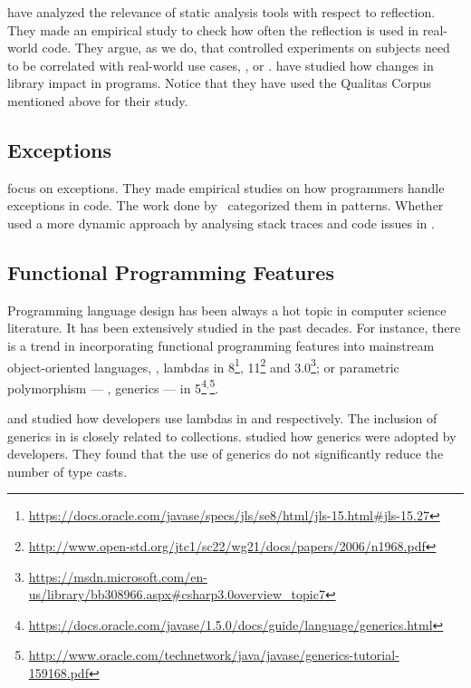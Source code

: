 \cite{landmanChallengesStaticAnalysis2017} have analyzed the relevance of static analysis tools with respect to reflection.
They made an empirical study to check how often the reflection \api{} is used in real-world code.
They argue, as we do, that controlled experiments on subjects need to be correlated with real-world use cases, \eg{}, \github{} or \mavencentral{}.
\cite{dietrichBrokenPromisesEmpirical2014} have studied how changes in \api{} library impact in \java{} programs.
Notice that they have used the Qualitas Corpus~\cite{temperoQualitasCorpusCurated2010} mentioned above for their study.

\subsection*{\textbf{Exceptions}}

\cite{keryExaminingProgrammerPractices2016,asaduzzamanHowDevelopersUse2016} focus on exceptions.
They made empirical studies on how programmers handle exceptions in \java{} code.
The work done by~\cite{nakshatriAnalysisExceptionHandling2016} categorized them in patterns.
Whether~\cite{coelhoUnveilingExceptionHandling2015} used a more dynamic approach by analysing stack traces and code issues in \github{}.

\subsection*{\textbf{Functional Programming Features}}

Programming language design has been always a hot topic in computer science literature.
It has been extensively studied in the past decades.
For instance, there is a trend in incorporating functional programming features into mainstream object-oriented languages, \eg, lambdas in \java{} 8\footnote{\url{https://docs.oracle.com/javase/specs/jls/se8/html/jls-15.html\#jls-15.27}}, \cpp{}11\footnote{\url{http://www.open-std.org/jtc1/sc22/wg21/docs/papers/2006/n1968.pdf}} and \cs{} 3.0\footnote{\url{https://msdn.microsoft.com/en-us/library/bb308966.aspx\#csharp3.0overview\_topic7}}; or parametric polymorphism --- \ie{}, generics --- in \java{} 5\footnote{\url{https://docs.oracle.com/javase/1.5.0/docs/guide/language/generics.html}}\(^{,}\)\footnote{\url{http://www.oracle.com/technetwork/java/javase/generics-tutorial-159168.pdf}}.

\cite{mazinanianUnderstandingUseLambda2017} and \cite{uesbeckEmpiricalStudyImpact2016} studied how developers use lambdas in \java{} and \cpp{} respectively.
The inclusion of generics in \java{} is closely related to collections. 
\cite{parninJavaGenericsAdoption2011,parninAdoptionUseJava2013} studied how generics were adopted by \java{} developers.
They found that the use of generics do not significantly reduce the number of type casts.

